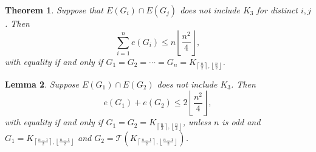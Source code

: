 \documentclass[a4paper]{article}
\newtheorem{theorem}{Theorem}[section]
\newtheorem{lemma}[theorem]{Lemma}
\begin{document}
\begin{theorem}
  Suppose that $E(G_i) \cap E(G_j)$ does not include $K_3$ for distinct $i, j$. Then
  \[
    \sum_{i = 1}^n e(G_i) \leq n\left\lfloor\frac{n^2}{4}\right\rfloor,
  \]
  with equality if and only if $G_1 = G_2 = \cdots = G_n = K_{\left\lceil\frac{n}{2}\right\rceil,
  \left\lfloor\frac{n}{2}\right\rfloor}$.
\end{theorem}

\begin{lemma}
  Suppose $E(G_1) \cap E(G_2)$ does not include $K_3$. Then
  \[
    e(G_1) + e(G_2) \leq 2\left\lfloor\frac{n^2}{4}\right\rfloor,
  \]
  with equality if and only if $G_1 = G_2 = K_{\left\lceil\frac{n}{2}\right\rceil,
  \left\lfloor\frac{n}{2}\right\rfloor}$, unless $n$ is odd and $G_1 = K_{\left\lceil\frac{n -
  1}{2}\right\rceil, \left\lfloor\frac{n - 1}{2}\right\rfloor}$ and $G_2 =
  \mathcal{T}(K_{\left\lceil\frac{n - 1}{2}\right\rceil, \left\lfloor\frac{n -
  1}{2}\right\rfloor})$.
\end{lemma}
\end{document}
